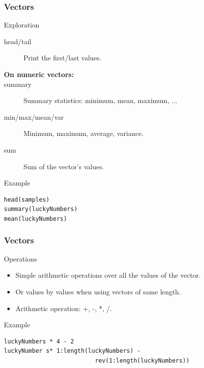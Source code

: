 \documentclass[10pt]{beamer}
\newenvironment{xframe}[2][]
  {\begin{frame}[fragile,environment=xframe,#1]
  \frametitle{#2}}
  {\end{frame}}
\begin{document}
\begin{xframe}{Vectors}
  \begin{block}{Exploration}
    \begin{description}
    \item[head/tail] Print the first/last values.
      \medskip
    \item[{\bf\small On numeric vectors:}]
    \item[summary] Summary statistics: minimum, mean, maximum, ...
    \item[min/max/mean/var] Minimum, maximum, average, variance.
    \item[sum] Sum of the vector's values.
    \end{description}
  \end{block}
  \begin{exampleblock}{Example}
\begin{verbatim}
head(samples)
summary(luckyNumbers)
mean(luckyNumbers)
\end{verbatim}
  \end{exampleblock}
\end{xframe}


\begin{xframe}{Vectors}
  \begin{block}{Operations}
    \begin{itemize}
    \item Simple arithmetic operations over all the values of the vector.
    \item  Or values by values when using vectors of same length.
    \item Arithmetic operation: +, -, *, /.
    \end{itemize}
  \end{block}
\begin{exampleblock}{Example}
\begin{verbatim}
luckyNumbers * 4 - 2
luckyNumber s* 1:length(luckyNumbers) - 
                          rev(1:length(luckyNumbers))
\end{verbatim}
  \end{exampleblock}
\end{xframe}
\end{document}
